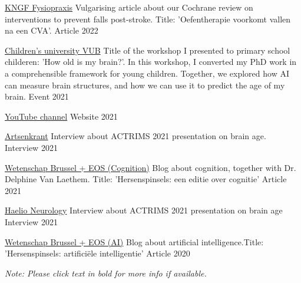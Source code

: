 \begin{cvhonors}
  \cvhonor
    {\href{https://issuu.com/kngfdefysiotherapeut/docs/fysiopraxis-_mei2022}{KNGF Fysiopraxis}} %
    {Vulgarising article about our Cochrane review on interventions to prevent falls post-stroke. Title: 'Oefentherapie voorkomt vallen na een CVA'.} %
    {Article} %
    {2022} %

  \cvhonor
    {\href{https://vubkinderuniversiteit.be/ku21-workshop-hoe-oud-is-mijn-brein/}{Children's university VUB}} %
    {Title of the workshop I presented to primary school childeren: 'How old is my brain?'. In this workshop, I converted my PhD work in a comprehensible framework for young children. Together, we explored how AI can measure brain structures, and how we can use it to predict the age of my brain.} %
    {Event} %
    {2021} %

  \cvhonor
    {\href{https://www.youtube.com/@apaperinasong1222}{YouTube channel}} %
    {} %
    {Website} %
    {2021} %

  \cvhonor
    {\href{https://artsenkrant.pmg.be/nl/dossier/EAKbe2118W19_00}{Artsenkrant}} %
    {Interview about ACTRIMS 2021 presentation on brain age.} %
    {Interview} %
    {2021} %

  \cvhonor
    {\href{https://www.eoswetenschap.eu/technologie/hersenspinsels-een-editie-over-cognitie}{Wetenschap Brussel + EOS (Cognition)}} %
    {Blog about cognition, together with Dr. Delphine Van Laethem. Title: 'Hersenspinsels: een editie over cognitie'} %
    {Article} %
    {2021} %

  \cvhonor
    {\href{https://www.healio.com/news/neurology/20210225/brain-age-serves-as-sensitive-marker-for-information-processing-speed-in-ms}{Haelio Neurology}} %
    {Interview about ACTRIMS 2021 presentation on brain age} %
    {Interview} %
    {2021} %

  \cvhonor
    {\href{https://www.eoswetenschap.eu/technologie/hersenspinsels-artificiele-intelligentie}{Wetenschap Brussel + EOS (AI)}} %
    {Blog about artificial intelligence.Title: 'Hersenspinsels: artificiële intelligentie'} %
    {Article} %
    {2020} %

\end{cvhonors}

 \hfill \textit{Note: Please click text in bold for more info if available.}